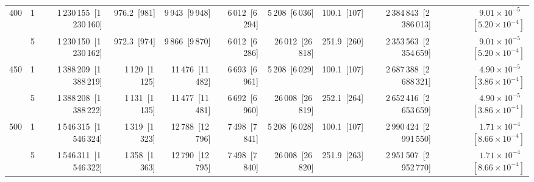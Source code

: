 \begin{tabular}{llrrrrrrrr}
\multirow[t]{2}{*}{400} & 1 & 1\,230\,155~{\footnotesize[1\,230\,160]} & 976.2~{\footnotesize[981]} & 9\,943~{\footnotesize[9\,948]} & 6\,012~{\footnotesize[6\,294]} & 5\,208~{\footnotesize[6\,036]} & 100.1~{\footnotesize[107]} & 2\,384\,843~{\footnotesize[2\,386\,013]} & $9.01\!\times\!10^{-5}$~{\footnotesize $[5.20\!\times\!10^{-4}]$} \\
 & 5 & 1\,230\,150~{\footnotesize[1\,230\,162]} & 972.3~{\footnotesize[974]} & 9\,866~{\footnotesize[9\,870]} & 6\,012~{\footnotesize[6\,286]} & 26\,012~{\footnotesize[26\,818]} & 251.9~{\footnotesize[260]} & 2\,353\,563~{\footnotesize[2\,354\,659]} & $9.01\!\times\!10^{-5}$~{\footnotesize $[5.20\!\times\!10^{-4}]$} \\
\cline{1-10}
\multirow[t]{2}{*}{450} & 1 & 1\,388\,209~{\footnotesize[1\,388\,219]} & 1\,120~{\footnotesize[1\,125]} & 11\,476~{\footnotesize[11\,482]} & 6\,693~{\footnotesize[6\,961]} & 5\,208~{\footnotesize[6\,029]} & 100.1~{\footnotesize[107]} & 2\,687\,388~{\footnotesize[2\,688\,321]} & $4.90\!\times\!10^{-5}$~{\footnotesize $[3.86\!\times\!10^{-4}]$} \\
 & 5 & 1\,388\,208~{\footnotesize[1\,388\,222]} & 1\,131~{\footnotesize[1\,135]} & 11\,477~{\footnotesize[11\,481]} & 6\,692~{\footnotesize[6\,960]} & 26\,008~{\footnotesize[26\,819]} & 252.1~{\footnotesize[264]} & 2\,652\,416~{\footnotesize[2\,653\,659]} & $4.90\!\times\!10^{-5}$~{\footnotesize $[3.86\!\times\!10^{-4}]$} \\
\cline{1-10}
\multirow[t]{2}{*}{500} & 1 & 1\,546\,315~{\footnotesize[1\,546\,324]} & 1\,319~{\footnotesize[1\,323]} & 12\,788~{\footnotesize[12\,796]} & 7\,498~{\footnotesize[7\,841]} & 5\,208~{\footnotesize[6\,028]} & 100.1~{\footnotesize[107]} & 2\,990\,424~{\footnotesize[2\,991\,550]} & $1.71\!\times\!10^{-4}$~{\footnotesize $[8.66\!\times\!10^{-4}]$} \\
 & 5 & 1\,546\,311~{\footnotesize[1\,546\,322]} & 1\,358~{\footnotesize[1\,363]} & 12\,790~{\footnotesize[12\,795]} & 7\,498~{\footnotesize[7\,840]} & 26\,008~{\footnotesize[26\,820]} & 251.9~{\footnotesize[263]} & 2\,951\,507~{\footnotesize[2\,952\,770]} & $1.71\!\times\!10^{-4}$~{\footnotesize $[8.66\!\times\!10^{-4}]$} \\
\cline{1-10}
\bottomrule
\end{tabular}
